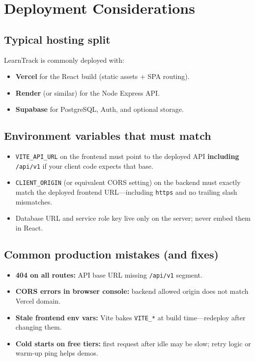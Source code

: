 
\chapter{Deployment Considerations}
\label{ch:deploy}

\section{Typical hosting split}
LearnTrack is commonly deployed with:

\begin{itemize}[leftmargin=*]
  \item \textbf{Vercel} for the React build (static assets + SPA routing).

  \item \textbf{Render} (or similar) for the Node Express API.

  \item \textbf{Supabase} for PostgreSQL, Auth, and optional storage.

\end{itemize}

\section{Environment variables that must match}
\begin{itemize}[leftmargin=*]
  \item \texttt{VITE\_API\_URL} on the frontend must point to the deployed API \textbf{including} \texttt{/api/v1} if your client code expects that base.

  \item \texttt{CLIENT\_ORIGIN} (or equivalent CORS setting) on the backend must exactly match the deployed frontend URL---including \texttt{https} and no trailing slash mismatches.

  \item Database URL and service role key live only on the server; never embed them in React.

\end{itemize}

\section{Common production mistakes (and fixes)}
\begin{itemize}[leftmargin=*]
  \item \textbf{404 on all routes:} API base URL missing \texttt{/api/v1} segment.

  \item \textbf{CORS errors in browser console:} backend allowed origin does not match Vercel domain.

  \item \textbf{Stale frontend env vars:} Vite bakes \texttt{VITE\_*} at build time---redeploy after changing them.

  \item \textbf{Cold starts on free tiers:} first request after idle may be slow; retry logic or warm-up ping helps demos.

\end{itemize}

